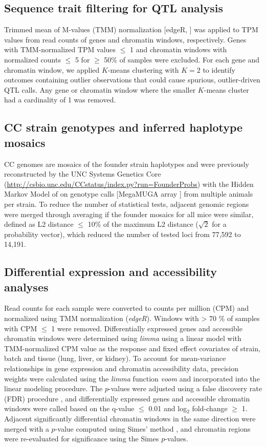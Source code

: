 \documentclass[9pt,twocolumn,twoside]{gsajnl}
\begin{document}
\subsection{Sequence trait filtering for QTL analysis}

Trimmed mean of M-values (TMM) normalization [edgeR, \citep{edgeR}] was applied to TPM values from read counts of genes and chromatin windows, respectively. Genes with TMM-normalized TPM values $\leq$ 1 and chromatin windows with normalized counts $\leq$ 5 for $\geq$ 50\% of samples were excluded. For each gene and chromatin window, we applied $K$-means clustering with $K=2$ to identify outcomes containing outlier observations that could cause spurious, outlier-driven QTL calls. Any gene or chromatin window where the smaller $K$-means cluster had a cardinality of 1 was removed.

\subsection{CC strain genotypes and inferred haplotype mosaics}

CC genomes are mosaics of the founder strain haplotypes and were previously reconstructed by the UNC Systems Genetics Core (\url{http://csbio.unc.edu/CCstatus/index.py?run=FounderProbs}) with the Hidden Markov Model of \cite{Fu2012} on genotype calls [MegaMUGA array \citep{Morgan2016muga}] from multiple animals per strain. To reduce the number of statistical tests, adjacent genomic regions were merged through averaging if the founder mosaics for all mice were similar, defined as L2 distance $\leq$ 10\% of the maximum L2 distance ($\sqrt{2}$ for a probability vector), which reduced the number of tested loci from 77,592 to 14,191.

\subsection{Differential expression and accessibility analyses}

Read counts for each sample were converted to counts per million (CPM) and normalized using TMM normalization (\textit{edgeR}). Windows with > 70 \% of samples with CPM $\leq$ 1 were removed. Differentially expressed genes and accessible chromatin windows were determined using \textit{limma} \citep{limma} using a linear model with TMM-normalized CPM value as the response and fixed effect covariates of strain, batch and tissue (lung, liver, or kidney). 
To account for mean-variance relationships in gene expression and chromatin accessibility data, precision weights were calculated using the \textit{limma} function \textit{voom} and incorporated into the linear modeling procedure. The $p$-values were adjusted using a false discovery rate (FDR) procedure \citep{Benjamini1995}, and differentially expressed genes and accessible chromatin windows were called based on the q-value $\le$ 0.01 and log$_{2}$ fold-change $\geq$ 1. Adjacent significantly differential chromatin windows in the same direction were merged with a $p$-value computed using Simes' method \citep{Sarkar1997}, and chromatin regions were re-evaluated for significance using the Simes $p$-values.
\end{document}
